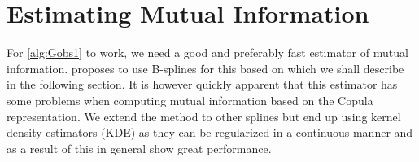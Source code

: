\documentclass[../Thesis.tex]{subfiles}
\begin{document}
\section{Estimating Mutual Information}\label{subsec:Mutual information estimation and KDE methods}
For \autoref{alg:Gobs1} to work, we need a good and preferably fast estimator of mutual information. \cite{Network-deconvolution-as-a-general-method-to-distinguish-direct-dependencies-in-networks} proposes to use B-splines for this based on \cite{RePEc:plo:pbio00:0050008} which we shall describe in the following section. It is however quickly apparent that this estimator has some problems when computing mutual information based on the Copula representation. We extend the method to other splines but end up using kernel density estimators (KDE) as they can be regularized in a continuous manner and as a result of this in general show great performance.
\end{document}
